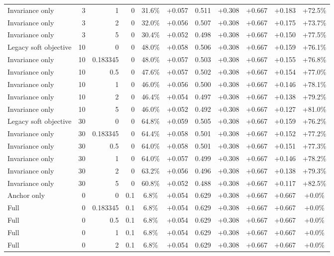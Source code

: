 \begin{table}[htbp]
\begin{tabular}{lrrrccccccc}
Invariance only & 3 & 1 & 0 & 31.6\% & +0.057 & 0.511 & +0.308 & +0.667 & +0.183 & +72.5\% \\
Invariance only & 3 & 2 & 0 & 32.0\% & +0.056 & 0.507 & +0.308 & +0.667 & +0.175 & +73.7\% \\
Invariance only & 3 & 5 & 0 & 30.4\% & +0.052 & 0.498 & +0.308 & +0.667 & +0.150 & +77.5\% \\
Legacy soft objective & 10 & 0 & 0 & 48.0\% & +0.058 & 0.506 & +0.308 & +0.667 & +0.159 & +76.1\% \\
Invariance only & 10 & 0.183345 & 0 & 48.0\% & +0.057 & 0.503 & +0.308 & +0.667 & +0.155 & +76.8\% \\
Invariance only & 10 & 0.5 & 0 & 47.6\% & +0.057 & 0.502 & +0.308 & +0.667 & +0.154 & +77.0\% \\
Invariance only & 10 & 1 & 0 & 46.0\% & +0.056 & 0.500 & +0.308 & +0.667 & +0.146 & +78.1\% \\
Invariance only & 10 & 2 & 0 & 46.4\% & +0.054 & 0.497 & +0.308 & +0.667 & +0.138 & +79.2\% \\
Invariance only & 10 & 5 & 0 & 46.0\% & +0.052 & 0.492 & +0.308 & +0.667 & +0.127 & +81.0\% \\
Legacy soft objective & 30 & 0 & 0 & 64.8\% & +0.059 & 0.505 & +0.308 & +0.667 & +0.159 & +76.2\% \\
Invariance only & 30 & 0.183345 & 0 & 64.4\% & +0.058 & 0.501 & +0.308 & +0.667 & +0.152 & +77.2\% \\
Invariance only & 30 & 0.5 & 0 & 64.0\% & +0.058 & 0.501 & +0.308 & +0.667 & +0.151 & +77.3\% \\
Invariance only & 30 & 1 & 0 & 64.0\% & +0.057 & 0.499 & +0.308 & +0.667 & +0.146 & +78.2\% \\
Invariance only & 30 & 2 & 0 & 63.2\% & +0.056 & 0.496 & +0.308 & +0.667 & +0.138 & +79.3\% \\
Invariance only & 30 & 5 & 0 & 60.8\% & +0.052 & 0.488 & +0.308 & +0.667 & +0.117 & +82.5\% \\
Anchor only & 0 & 0 & 0.1 & 6.8\% & +0.054 & 0.629 & +0.308 & +0.667 & +0.667 & +0.0\% \\
Full & 0 & 0.183345 & 0.1 & 6.8\% & +0.054 & 0.629 & +0.308 & +0.667 & +0.667 & +0.0\% \\
Full & 0 & 0.5 & 0.1 & 6.8\% & +0.054 & 0.629 & +0.308 & +0.667 & +0.667 & +0.0\% \\
Full & 0 & 1 & 0.1 & 6.8\% & +0.054 & 0.629 & +0.308 & +0.667 & +0.667 & +0.0\% \\
Full & 0 & 2 & 0.1 & 6.8\% & +0.054 & 0.629 & +0.308 & +0.667 & +0.667 & +0.0\% \\

\end{tabular}
\end{table}
